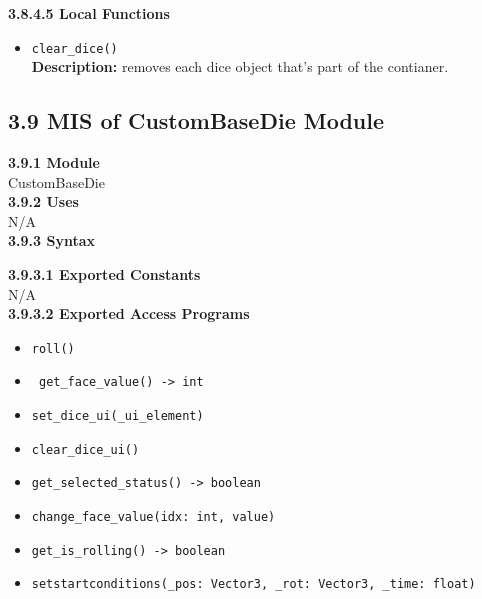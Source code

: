 \documentclass[12pt, titlepage]{article}
\begin{document}
\textbf{3.8.4.5 Local Functions}

\begin{itemize}
	
	\item \texttt{clear\_dice() }\\
	\textbf{Description:} removes each dice object that's part of the contianer. 
	
\end{itemize}


\subsection*{3.9 MIS of CustomBaseDie Module}
\textbf{3.9.1 Module}\\
 CustomBaseDie\\

\noindent \textbf{3.9.2 Uses}\\
N/A \\

\noindent \textbf{3.9.3 Syntax}

\noindent \textbf{3.9.3.1 Exported Constants}\\
N/A\\

\textbf{3.9.3.2 Exported Access Programs}
\begin{itemize}
	\item \texttt{roll() }
	\item \texttt{ get\_face\_value() -> int }
	\item \texttt{set\_dice\_ui(\_ui\_element) }
	\item \texttt{clear\_dice\_ui() }
	\item \texttt{get\_selected\_status() -> boolean}
	\item \texttt{change\_face\_value(idx: int, value) }
	\item \texttt{get\_is\_rolling() -> boolean }
	\item \texttt{setstartconditions(\_pos: Vector3, \_rot: Vector3, \_time: float) }
	
	
\end{itemize}
\end{document}
